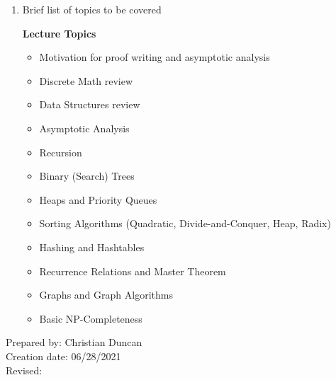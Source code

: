 \begin{enumerate}[1.]
\item Brief list of topics to be covered\\
  {\bfseries
    Lecture Topics
    \begin{itemize}
      \item Motivation for proof writing and asymptotic analysis
      \item Discrete Math review
      \item Data Structures review
      \item Asymptotic Analysis
      \item Recursion
      \item Binary (Search) Trees
      \item Heaps and Priority Queues
      \item Sorting Algorithms (Quadratic, Divide-and-Conquer, Heap, Radix)
      \item Hashing and Hashtables
      \item Recurrence Relations and Master Theorem
      \item Graphs and Graph Algorithms
      \item Basic NP-Completeness
    \end{itemize}
  }

\end{enumerate}

\noindent Prepared by: Christian Duncan\\
\noindent Creation date: 06/28/2021\\
\noindent Revised:\\
